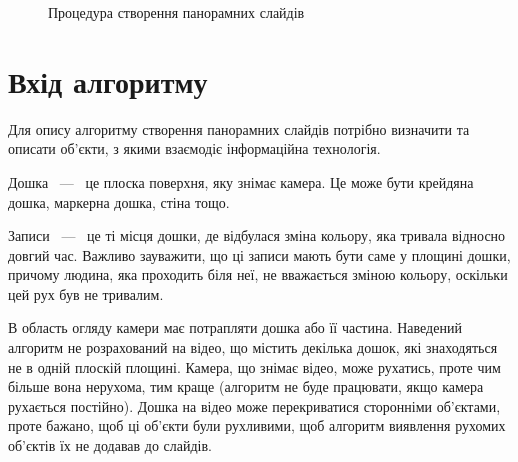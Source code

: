 \usetikzlibrary{arrows,positioning,shapes}
\begin{figure}[H]
    \begin{center}
    \end{center}
    \caption{Процедура створення панорамних слайдів
        \label{fig:pipeline}
    }
\end{figure}
\section{Вхід алгоритму}
Для опису алгоритму створення панорамних слайдів потрібно визначити та
описати об'єкти, з якими взаємодіє інформаційна технологія.

Дошка ~---~ це плоска поверхня, яку знімає камера. Це може бути крейдяна
дошка, маркерна дошка, стіна тощо.

Записи ~---~ це ті місця дошки, де відбулася зміна кольору, яка тривала
відносно довгий час. Важливо зауважити, що ці записи мають бути
саме у площині дошки, причому людина, яка проходить біля неї, не вважається
зміною кольору, оскільки цей рух був не тривалим.

В область огляду камери має потрапляти дошка або її частина. Наведений
алгоритм не розрахований на відео, що містить декілька дошок, які знаходяться
не в одній плоскій площині. Камера, що знімає відео, може рухатись, проте
чим більше вона нерухома, тим краще (алгоритм не буде працювати, якщо камера
рухається постійно). Дошка на відео може перекриватися сторонніми об'єктами,
проте бажано, щоб ці об'єкти були рухливими, щоб алгоритм виявлення рухомих
об'єктів їх не додавав до слайдів.

